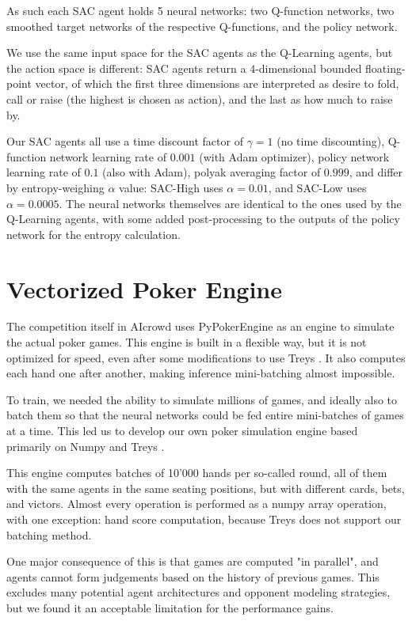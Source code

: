 As such each SAC agent holds 5 neural networks: two Q-function networks, two smoothed target networks of the respective Q-functions, and the policy network.

We use the same input space for the SAC agents as the Q-Learning agents, but the action space is different: SAC agents return a 4-dimensional bounded floating-point vector, of which the first three dimensions are interpreted as desire to fold, call or raise (the highest is chosen as action), and the last as how much to raise by.

Our SAC agents all use a time discount factor of $\gamma = 1$ (no time discounting), Q-function network learning rate of $0.001$ (with Adam optimizer), policy network learning rate of $0.1$ (also with Adam), polyak averaging factor of $0.999$, and differ by entropy-weighing $\alpha$ value: SAC-High uses $\alpha = 0.01$, and SAC-Low uses $\alpha = 0.0005$. The neural networks themselves are identical to the ones used by the Q-Learning agents, with some added post-processing to the outputs of the policy network for the entropy calculation.

\section{Vectorized Poker Engine}
The competition itself in AIcrowd uses PyPokerEngine \cite{Pypokerengine} as an engine to simulate the actual poker games. This engine is built in a flexible way, but it is not optimized for speed, even after some modifications to use Treys \cite{Treys}. It also computes each hand one after another, making inference mini-batching almost impossible.

To train, we needed the ability to simulate millions of games, and ideally also to batch them so that the neural networks could be fed entire mini-batches of games at a time. This led us to develop our own poker simulation engine based primarily on Numpy \cite{Numpy} and Treys \cite{Treys}.

This engine computes batches of 10'000 hands per so-called round, all of them with the same agents in the same seating positions, but with different cards, bets, and victors. Almost every operation is performed as a numpy array operation, with one exception: hand score computation, because Treys does not support our batching method.

One major consequence of this is that games are computed "in parallel", and agents cannot form judgements based on the history of previous games. This excludes many potential agent architectures and opponent modeling strategies, but we found it an acceptable limitation for the performance gains.

